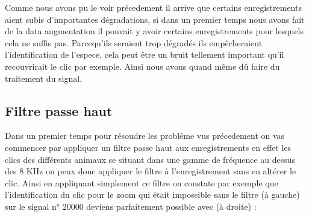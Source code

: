 Comme nous avons pu le voir précedement il arrive que certains enregistrements aient subis d'importantes dégradations, si dans un premier temps nous avons fait de la data augmentation il pouvait y avoir certains enregistrements pour lesquels cela ne suffis pas. Parcequ'ils seraient trop dégradés ils empêcheraient l'identification de l'espece, cela peut être un bruit tellement important qu'il recouvrirait le clic par exemple. Ainsi nous avons quand même dû faire du traitement du signal.

\hypertarget{Filtre-passe-haut}{%
\subsection{Filtre passe haut}
\label{Filtre-passe-haut}}

Dans un premier temps pour résoudre les probléme vus précedement on  vas commencer par appliquer un filtre passe haut aux enregistrements en effet les clics des différents animaux se situant dans une gamme de fréquence au dessus des 8 KHz on peux donc appliquer le filtre à l'enregistrement sans en altérer le clic.
Ainsi en appliquant simplement ce filtre on constate par exemple que l'identification du clic pour le zoom qui était impossible sans le filtre (à gauche) sur le signal n° 20000 deviens parfaitement possible avec (à droite) :


